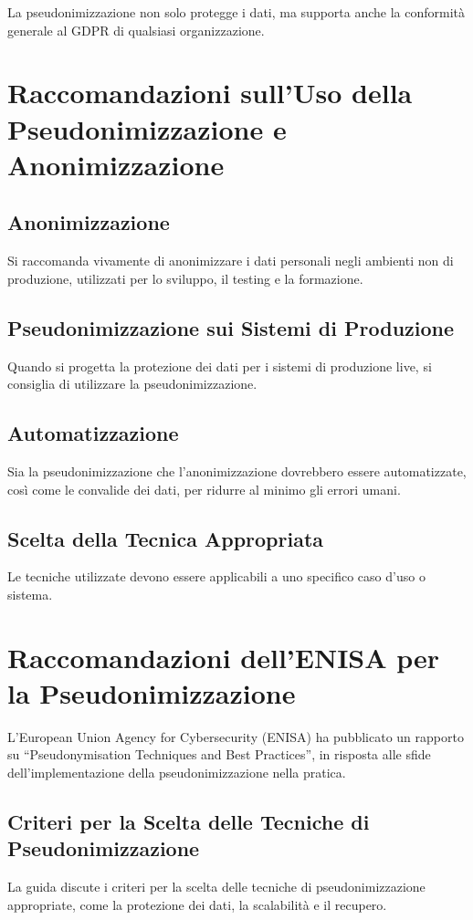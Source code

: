 La pseudonimizzazione non solo protegge i dati, ma supporta anche la conformità generale al GDPR di qualsiasi organizzazione.

\section{Raccomandazioni sull'Uso della Pseudonimizzazione e Anonimizzazione}
\subsection{Anonimizzazione}
Si raccomanda vivamente di anonimizzare i dati personali negli ambienti non di produzione, utilizzati per lo sviluppo, il testing e la formazione. 

\subsection{Pseudonimizzazione sui Sistemi di Produzione}
Quando si progetta la protezione dei dati per i sistemi di produzione live, si consiglia di utilizzare la pseudonimizzazione. 

\subsection{Automatizzazione}
Sia la pseudonimizzazione che l'anonimizzazione dovrebbero essere automatizzate, così come le convalide dei dati, per ridurre al minimo gli errori umani.

\subsection{Scelta della Tecnica Appropriata}
Le tecniche utilizzate devono essere applicabili a uno specifico caso d'uso o sistema.


\section{Raccomandazioni dell'ENISA per la Pseudonimizzazione}
L'European Union Agency for Cybersecurity (ENISA) ha pubblicato un rapporto su “Pseudonymisation Techniques and Best Practices”, in risposta alle sfide dell'implementazione della pseudonimizzazione nella pratica.

\subsection{Criteri per la Scelta delle Tecniche di Pseudonimizzazione}
La guida discute i criteri per la scelta delle tecniche di pseudonimizzazione appropriate, come la protezione dei dati, la scalabilità e il recupero. 

